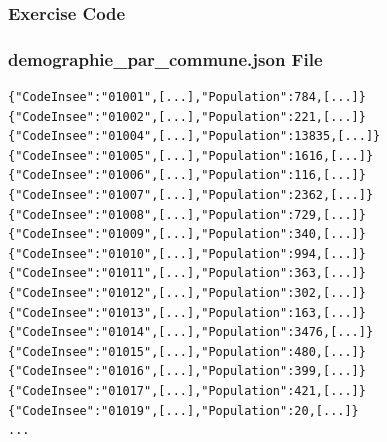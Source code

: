 \documentclass[slidetop,9pt,utf8]{beamer}
\begin{document}
\begin{frame}
  \frametitle{Exercise Code}

  

\end{frame}

\begin{frame}[fragile]
  \frametitle{demographie\_par\_commune.json File}

  \begin{verbatim}
{"CodeInsee":"01001",[...],"Population":784,[...]}
{"CodeInsee":"01002",[...],"Population":221,[...]}
{"CodeInsee":"01004",[...],"Population":13835,[...]}
{"CodeInsee":"01005",[...],"Population":1616,[...]}
{"CodeInsee":"01006",[...],"Population":116,[...]}
{"CodeInsee":"01007",[...],"Population":2362,[...]}
{"CodeInsee":"01008",[...],"Population":729,[...]}
{"CodeInsee":"01009",[...],"Population":340,[...]}
{"CodeInsee":"01010",[...],"Population":994,[...]}
{"CodeInsee":"01011",[...],"Population":363,[...]}
{"CodeInsee":"01012",[...],"Population":302,[...]}
{"CodeInsee":"01013",[...],"Population":163,[...]}
{"CodeInsee":"01014",[...],"Population":3476,[...]}
{"CodeInsee":"01015",[...],"Population":480,[...]}
{"CodeInsee":"01016",[...],"Population":399,[...]}
{"CodeInsee":"01017",[...],"Population":421,[...]}
{"CodeInsee":"01019",[...],"Population":20,[...]}
...
  \end{verbatim}
\end{frame}
\end{document}
